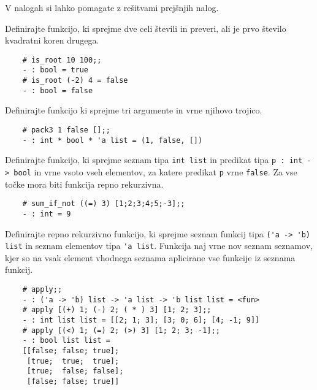 \documentclass[arhiv]{../izpit}
\begin{document}
	
	
	
	V nalogah si lahko pomagate z rešitvami prejšnjih nalog.
	
	\naloga
	
	\podnaloga Definirajte funkcijo, ki sprejme dve celi števili in preveri, ali je prvo število kvadratni koren drugega. 
	
	\begin{verbatim}
	# is_root 10 100;;
	- : bool = true
	# is_root (-2) 4 = false
	- : bool = false
	\end{verbatim}
	
	\podnaloga Definirajte funkcijo ki sprejme tri argumente in vrne njihovo trojico.
	\begin{verbatim}
	# pack3 1 false [];;
	- : int * bool * 'a list = (1, false, [])
	\end{verbatim}
	
	\podnaloga Definirajte funkcijo, ki sprejme seznam tipa \verb|int list| in predikat tipa \verb|p : int -> bool| in vrne vsoto vseh elementov, za katere predikat \verb|p| vrne \verb|false|. Za vse točke mora biti funkcija repno rekurzivna.
	
	\begin{verbatim}
	# sum_if_not ((=) 3) [1;2;3;4;5;-3];;
	- : int = 9
	\end{verbatim}
	
	
	
	\podnaloga Definirajte repno rekurzivno funkcijo, ki sprejme seznam funkcij tipa \verb|('a -> 'b) list| in seznam elementov tipa \verb|'a list|. Funkcija naj vrne nov seznam seznamov, kjer so na vsak element vhodnega seznama aplicirane vse funkcije iz seznama funkcij.
	
	\begin{verbatim}
	# apply;;
	- : ('a -> 'b) list -> 'a list -> 'b list list = <fun>
	# apply [(+) 1; (-) 2; ( * ) 3] [1; 2; 3];;
	- : int list list = [[2; 1; 3]; [3; 0; 6]; [4; -1; 9]]
	# apply [(<) 1; (=) 2; (>) 3] [1; 2; 3; -1];;
	- : bool list list =
	[[false; false; true]; 
	 [true;  true;  true];
	 [true;  false; false]; 
	 [false; false; true]]
	\end{verbatim}
\end{document}
